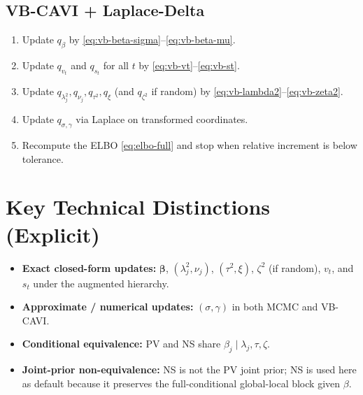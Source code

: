 \documentclass[11pt]{article}
\newcommand{\vect}[1]{\bm{#1}}
\begin{document}
\subsection{VB-CAVI + Laplace-Delta}
\begin{enumerate}[leftmargin=1.7em]
  \item Update $q_\beta$ by \eqref{eq:vb-beta-sigma}--\eqref{eq:vb-beta-mu}.
  \item Update $q_{v_t}$ and $q_{s_t}$ for all $t$ by \eqref{eq:vb-vt}--\eqref{eq:vb-st}.
  \item Update $q_{\lambda_j^2},q_{\nu_j},q_{\tau^2},q_\xi$ (and $q_{\zeta^2}$ if random) by
  \eqref{eq:vb-lambda2}--\eqref{eq:vb-zeta2}.
  \item Update $q_{\sigma,\gamma}$ via Laplace on transformed coordinates.
  \item Recompute the ELBO \eqref{eq:elbo-full} and stop when relative increment is below tolerance.
\end{enumerate}

\section{Key Technical Distinctions (Explicit)}
\label{sec:distinctions}

\begin{itemize}[leftmargin=1.7em]
  \item \textbf{Exact closed-form updates:} $\vect{\beta}$, $(\lambda_j^2,\nu_j)$, $(\tau^2,\xi)$,
  $\zeta^2$ (if random), $v_t$, and $s_t$ under the augmented hierarchy.
  \item \textbf{Approximate / numerical updates:} $(\sigma,\gamma)$ in both MCMC and VB-CAVI.
  \item \textbf{Conditional equivalence:} PV and NS share
  $\beta_j\mid\lambda_j,\tau,\zeta$.
  \item \textbf{Joint-prior non-equivalence:} NS is not the PV joint prior; NS is used here as default because it preserves the full-conditional global-local block given $\beta$.
\end{itemize}
\end{document}

